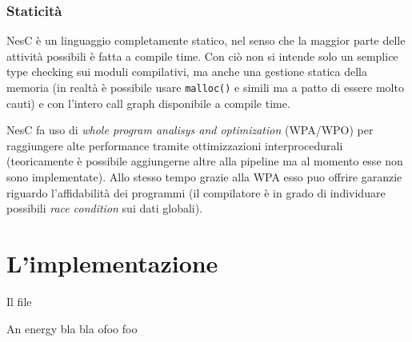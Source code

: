 \documentclass[pdftex,12pt,a4paper,italian,openany]{book}
\begin{document}
\subsection{Staticità}

NesC è un linguaggio completamente statico, nel senso che la maggior parte delle attività 
possibili è fatta a compile time. Con ciò non si intende solo un semplice type checking sui 
moduli compilativi, ma anche una gestione statica della memoria (in realtà è possibile usare 
\texttt{malloc()} e simili ma a patto di essere molto cauti) e con l'intero call graph disponibile a compile time. 

NesC fa uso di \emph{whole program analisys and optimization} (WPA/WPO) per raggiungere alte 
performance tramite ottimizzazioni interprocedurali (teoricamente è possibile aggiungerne altre 
alla pipeline ma al momento esse non sono implementate).
Allo stesso tempo grazie alla WPA esso puo offrire garanzie riguardo l'affidabilità dei 
programmi (il compilatore è in grado di individuare possibili \emph{race condition} sui dati globali).


\chapter{L'implementazione}
Il file 


\begin{thebibliography}{99}
 An energy bla bla
 ofoo foo
\end{thebibliography}
\end{document}

